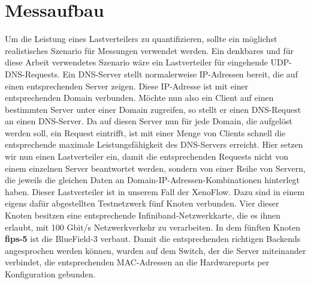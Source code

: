 \section{Messaufbau}
Um die Leistung eines Lastverteilers zu quantifizieren, sollte ein möglichst realistisches Szenario für Messungen verwendet werden. Ein denkbares und für diese Arbeit verwendetes Szenario wäre ein Lastverteiler für eingehende UDP-DNS-Requests. Ein DNS-Server stellt normalerweise IP-Adressen bereit, die auf einen entsprechenden Server zeigen. Diese IP-Adresse ist mit einer entsprechenden Domain verbunden. Möchte nun also ein Client auf einen bestimmten Server unter einer Domain zugreifen, so stellt er einen DNS-Request an einen DNS-Server. Da auf diesen Server nun für jede Domain, die aufgelöst werden soll, ein Request eintrifft, ist mit einer Menge von Clients schnell die entsprechende maximale Leistungsfähigkeit des DNS-Servers erreicht. Hier setzen wir nun einen Lastverteiler ein, damit die entsprechenden Requests nicht von einem einzelnen Server beantwortet werden, sondern von einer Reihe von Servern, die jeweils die gleichen Daten an Domain-IP-Adressen-Kombinationen hinterlegt haben. Dieser Lastverteiler ist in unserem Fall der XenoFlow. Dazu sind in einem eigens dafür abgestellten Testnetzwerk fünf Knoten verbunden. Vier dieser Knoten besitzen eine entsprechende Infiniband-Netzwerkkarte, die es ihnen erlaubt, mit 100 Gbit/s Netzwerkverkehr zu verarbeiten. In dem fünften Knoten \textbf{fips-5} ist die BlueField-3 verbaut. Damit die entsprechenden richtigen Backends angesprochen werden können, wurden auf dem Switch, der die Server miteinander verbindet, die entsprechenden MAC-Adressen an die Hardwareports per Konfiguration gebunden.
